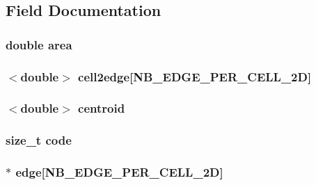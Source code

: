 \subsection{Field Documentation}
\hypertarget{classFVCell2D_ae517bffd82b9428b4f1d9500ea01c04f}{
\subsubsection[{area}]{\setlength{\rightskip}{0pt plus 5cm}double {\bf area}}}
\label{da/da3/classFVCell2D_ae517bffd82b9428b4f1d9500ea01c04f}
\hypertarget{classFVCell2D_a99bffb94997ba2dc39e4184c17166cce}{
\subsubsection[{cell2edge}]{$<$double$>$ {\bf cell2edge}\mbox{[}NB\_\-EDGE\_\-PER\_\-CELL\_\-2D\mbox{]}}}
\label{da/da3/classFVCell2D_a99bffb94997ba2dc39e4184c17166cce}
\hypertarget{classFVCell2D_ab3ed78ad91cf05def39147f46817c454}{
\subsubsection[{centroid}]{$<$double$>$ {\bf centroid}}}
\label{da/da3/classFVCell2D_ab3ed78ad91cf05def39147f46817c454}
\hypertarget{classFVCell2D_acf258c3b3328a96e3ee1e3b875b7874f}{
\subsubsection[{code}]{\setlength{\rightskip}{0pt plus 5cm}size\_\-t {\bf code}}}
\label{da/da3/classFVCell2D_acf258c3b3328a96e3ee1e3b875b7874f}
\hypertarget{classFVCell2D_aaef61084c7d087b06124b4e122b26eba}{
\subsubsection[{edge}]{$\ast$ {\bf edge}\mbox{[}NB\_\-EDGE\_\-PER\_\-CELL\_\-2D\mbox{]}}}
\label{da/da3/classFVCell2D_aaef61084c7d087b06124b4e122b26eba}
